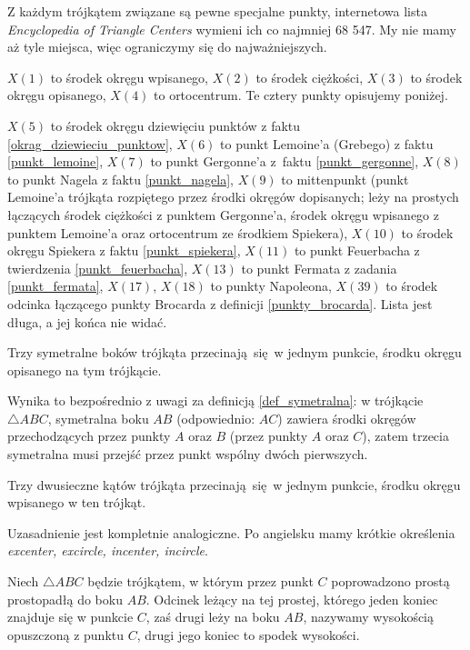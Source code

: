 Z każdym trójkątem związane są pewne specjalne punkty, internetowa lista \emph{Encyclopedia of Triangle Centers} wymieni ich co najmniej 68 547.
My nie mamy aż tyle miejsca, więc ograniczymy się do najważniejszych.

$X(1)$ to środek okręgu wpisanego, 
$X(2)$ to środek ciężkości,
$X(3)$ to środek okręgu opisanego,
$X(4)$ to ortocentrum.
Te cztery punkty opisujemy poniżej.

$X(5)$ to środek okręgu dziewięciu punktów z faktu \ref{okrag_dziewieciu_punktow},
$X(6)$ to punkt Lemoine'a (Grebego) z faktu \ref{punkt_lemoine},
$X(7)$ to punkt Gergonne'a z~faktu \ref{punkt_gergonne},
$X(8)$ to punkt Nagela z faktu \ref{punkt_nagela}, 
$X(9)$ to mittenpunkt (punkt Lemoine'a trójkąta rozpiętego przez środki okręgów dopisanych; leży na prostych łączących środek ciężkości z punktem Gergonne'a, środek okręgu wpisanego z punktem Lemoine'a oraz ortocentrum ze środkiem Spiekera), %
$X(10)$ to środek okręgu Spiekera z faktu \ref{punkt_spiekera},
$X(11)$ to punkt Feuerbacha z twierdzenia \ref{punkt_feuerbacha},
$X(13)$ to punkt Fermata z zadania \ref{punkt_fermata},
$X(17)$, $X(18)$ to punkty Napoleona,
$X(39)$ to środek odcinka łączącego punkty Brocarda z definicji \ref{punkty_brocarda}.
Lista jest długa, a jej końca nie widać.

\begin{proposition}
    Trzy symetralne boków trójkąta przecinają się w jednym punkcie, środku okręgu opisanego na tym trójkącie.
\end{proposition}

Wynika to bezpośrednio z uwagi za definicją \ref{def_symetralna}: w trójkącie $\triangle ABC$, symetralna boku $AB$ (odpowiednio: $AC$) zawiera środki okręgów przechodzących przez punkty $A$ oraz $B$ (przez punkty $A$ oraz $C$), zatem trzecia symetralna musi przejść przez punkt wspólny dwóch pierwszych.

\begin{proposition}
    Trzy dwusieczne kątów trójkąta przecinają się w jednym punkcie, środku okręgu wpisanego w ten trójkąt.
\end{proposition}

Uzasadnienie jest kompletnie analogiczne.
Po angielsku mamy krótkie określenia \emph{excenter, excircle, incenter, incircle}.

\begin{definition}[wysokość]
%
    Niech $\triangle ABC$ będzie trójkątem, w którym przez punkt $C$ poprowadzono prostą prostopadłą do boku $AB$.
    Odcinek leżący na tej prostej, którego jeden koniec znajduje się w punkcie $C$, zaś drugi leży na boku $AB$, nazywamy wysokością opuszczoną z punktu $C$, drugi jego koniec to spodek wysokości.
\end{definition}

